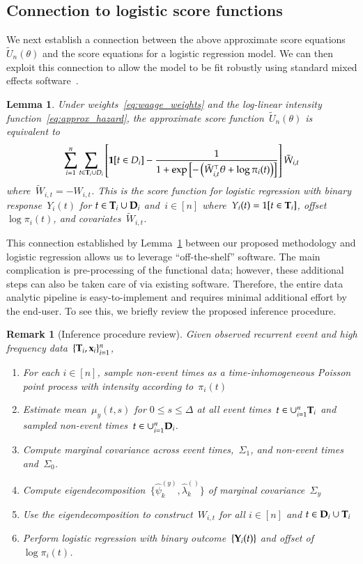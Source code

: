 \documentclass[11pt]{amsart}
\newtheorem{lemma}[thm]{Lemma}
\newtheorem{rmk}[thm]{Remark}%
\def\Y{{\bf Y}}
\def\bfx{{\bf x}}
\def\bfT{{\bf T}}
\def\bfD{{\bf D}}
\begin{document}
\subsection{Connection to logistic score functions}

We next establish a connection between the above approximate score equations~$\tilde U_n (\theta)$ and the score equations for a logistic regression model. We can then exploit this connection to allow the model to be fit robustly using standard mixed effects software~\citep{Ruppert2002, McCulloch2001}.

\begin{lemma} \normalfont
\label{lemma:logistic}
Under weights~\eqref{eq:waage_weights} and the log-linear intensity function~\eqref{eq:approx_hazard}, the approximate score function~$\tilde U_n (\theta)$ is equivalent to
\[
\sum_{i=1}^n \sum_{t \in \bfT_i \cup D_i } \left[ {\bf 1}[t \in D_i]
  - \frac{1}{1 + \exp \left[- \left( \tilde{W}_{i,t}^\top \theta +
        \log \pi_i (t) \right) \right]} \right] \tilde{W}_{i,t}
\]
where~$\tilde W_{i,t} = -W_{i,t}$. This is the score function for logistic regression with binary response~$Y_i(t)$ for $t \in \bfT_i \cup \bfD_i$ and~$i \in [n]$ where~$Y_i(t) = 1[t \in \bfT_i]$, offset~$\log \pi_i (t)$, and covariates~$\tilde W_{i,t}$.
\end{lemma}

This connection established by Lemma~\ref{lemma:logistic} between our proposed methodology and logistic regression allows us to leverage ``off-the-shelf'' software.  The main complication is pre-processing of the functional data; however, these additional steps can also be taken care of via existing software.  Therefore, the entire data analytic pipeline is easy-to-implement and requires minimal additional effort by the end-user. To see this, we briefly review the proposed inference procedure.

\begin{rmk}[Inference procedure review] \normalfont
Given observed recurrent event and high frequency data~$\{ \bfT_i, \bfx_i \}_{i=1}^n$,
\begin{enumerate}
\item For each $i \in [n]$, sample non-event times as a time-inhomogeneous Poisson point process with intensity according to~$\pi_i (t)$
\item Estimate mean~$\mu_y (t,s)$ for $0 \leq s \leq \Delta$ at all event times~$t \in \cup_{i=1}^n \bfT_i$ and sampled non-event times~$t \in \cup_{i=1}^n \bfD_i$.
\item Compute marginal covariance across event times,~$\Sigma_1$, and non-event times and~$\Sigma_0$.
\item Compute eigendecomposition~$\{ \hat \psi_k^{(y)}, \hat \lambda_k^{()} \}$ of marginal covariance~$\Sigma_y$
\item Use the eigendecomposition to construct~$W_{i,t}$ for all $i \in [n]$ and $t \in \bfD_i \cup \bfT_i$
\item \label{point:log} Perform logistic regression with binary outcome~$\{ \Y_i (t) \}$  and offset of~$\log \pi_i (t)$.
\end{enumerate}
\end{rmk}
\end{document}
